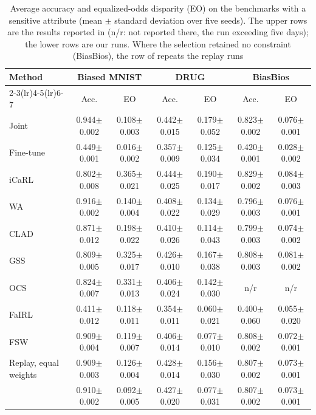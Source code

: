 \begin{table}[t]
\centering
\caption{Average accuracy and equalized-odds disparity (EO) on the benchmarks with a sensitive attribute (mean $\pm$ standard deviation over five seeds). The upper rows are the results reported in \cite{park2026fsw} (n/r: not reported there, the run exceeding five days); the lower rows are our runs. Where the selection retained no constraint (BiasBios), the row of \method{} repeats the replay runs}\label{tab:eo}
\footnotesize
\setlength{\tabcolsep}{3pt}
\begin{tabular}{lcccccc}
\toprule
Method & \multicolumn{2}{c}{Biased MNIST} & \multicolumn{2}{c}{DRUG} & \multicolumn{2}{c}{BiasBios} \\
\cmidrule(lr){2-3}\cmidrule(lr){4-5}\cmidrule(lr){6-7}
 & Acc. & EO & Acc. & EO & Acc. & EO \\
\midrule
Joint & 0.944\tiny{$\pm$0.002} & 0.108\tiny{$\pm$0.003} & 0.442\tiny{$\pm$0.015} & 0.179\tiny{$\pm$0.052} & 0.823\tiny{$\pm$0.002} & 0.076\tiny{$\pm$0.001} \\
Fine-tune & 0.449\tiny{$\pm$0.001} & 0.016\tiny{$\pm$0.002} & 0.357\tiny{$\pm$0.009} & 0.125\tiny{$\pm$0.034} & 0.420\tiny{$\pm$0.001} & 0.028\tiny{$\pm$0.002} \\
\midrule
iCaRL & 0.802\tiny{$\pm$0.008} & 0.365\tiny{$\pm$0.021} & 0.444\tiny{$\pm$0.025} & 0.190\tiny{$\pm$0.017} & 0.829\tiny{$\pm$0.002} & 0.084\tiny{$\pm$0.003} \\
WA & 0.916\tiny{$\pm$0.002} & 0.140\tiny{$\pm$0.004} & 0.408\tiny{$\pm$0.022} & 0.134\tiny{$\pm$0.029} & 0.796\tiny{$\pm$0.003} & 0.076\tiny{$\pm$0.001} \\
CLAD & 0.871\tiny{$\pm$0.012} & 0.198\tiny{$\pm$0.022} & 0.410\tiny{$\pm$0.026} & 0.114\tiny{$\pm$0.043} & 0.799\tiny{$\pm$0.003} & 0.074\tiny{$\pm$0.002} \\
GSS & 0.809\tiny{$\pm$0.005} & 0.325\tiny{$\pm$0.017} & 0.426\tiny{$\pm$0.010} & 0.167\tiny{$\pm$0.038} & 0.808\tiny{$\pm$0.003} & 0.081\tiny{$\pm$0.002} \\
OCS & 0.824\tiny{$\pm$0.007} & 0.331\tiny{$\pm$0.013} & 0.406\tiny{$\pm$0.024} & 0.142\tiny{$\pm$0.030} & n/r & n/r \\
FaIRL & 0.411\tiny{$\pm$0.012} & 0.118\tiny{$\pm$0.011} & 0.354\tiny{$\pm$0.011} & 0.060\tiny{$\pm$0.021} & 0.400\tiny{$\pm$0.060} & 0.055\tiny{$\pm$0.020} \\
FSW \cite{park2026fsw} & 0.909\tiny{$\pm$0.004} & 0.119\tiny{$\pm$0.007} & 0.406\tiny{$\pm$0.014} & 0.077\tiny{$\pm$0.010} & 0.808\tiny{$\pm$0.002} & 0.072\tiny{$\pm$0.001} \\
\midrule
Replay, equal weights & 0.909\tiny{$\pm$0.003} & 0.126\tiny{$\pm$0.004} & 0.428\tiny{$\pm$0.014} & 0.156\tiny{$\pm$0.030} & 0.807\tiny{$\pm$0.002} & 0.073\tiny{$\pm$0.001} \\
\method{} & 0.910\tiny{$\pm$0.002} & 0.092\tiny{$\pm$0.005} & 0.427\tiny{$\pm$0.020} & 0.077\tiny{$\pm$0.031} & 0.807\tiny{$\pm$0.002} & 0.073\tiny{$\pm$0.001} \\
\bottomrule
\end{tabular}
\end{table}
